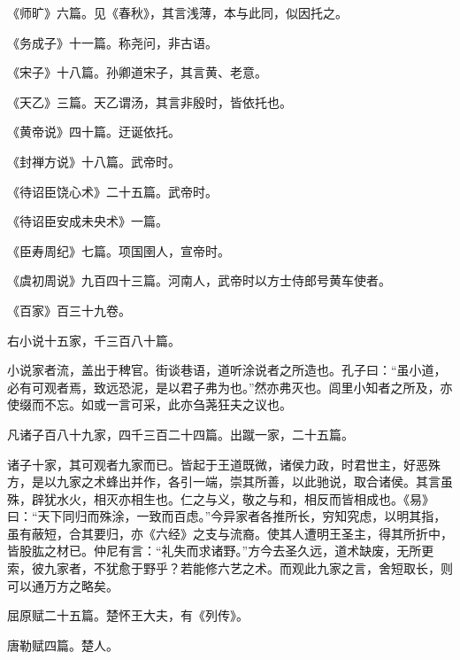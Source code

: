 \documentclass[12pt,UTF8]{ctexbook}
\begin{document}
《师旷》六篇。见《春秋》，其言浅薄，本与此同，似因托之。



《务成子》十一篇。称尧问，非古语。



《宋子》十八篇。孙卿道宋子，其言黄、老意。



《天乙》三篇。天乙谓汤，其言非殷时，皆依托也。



《黄帝说》四十篇。迂诞依托。



《封禅方说》十八篇。武帝时。



《待诏臣饶心术》二十五篇。武帝时。



《待诏臣安成未央术》一篇。



《臣寿周纪》七篇。项国圉人，宣帝时。



《虞初周说》九百四十三篇。河南人，武帝时以方士侍郎号黄车使者。



《百家》百三十九卷。



右小说十五家，千三百八十篇。



小说家者流，盖出于稗官。街谈巷语，道听涂说者之所造也。孔子曰：“虽小道，必有可观者焉，致远恐泥，是以君子弗为也。”然亦弗灭也。闾里小知者之所及，亦使缀而不忘。如或一言可采，此亦刍荛狂夫之议也。



凡诸子百八十九家，四千三百二十四篇。出蹴一家，二十五篇。



诸子十家，其可观者九家而已。皆起于王道既微，诸侯力政，时君世主，好恶殊方，是以九家之术蜂出并作，各引一端，崇其所善，以此驰说，取合诸侯。其言虽殊，辟犹水火，相灭亦相生也。仁之与义，敬之与和，相反而皆相成也。《易》曰：“天下同归而殊涂，一致而百虑。”今异家者各推所长，穷知究虑，以明其指，虽有蔽短，合其要归，亦《六经》之支与流裔。使其人遭明王圣主，得其所折中，皆股肱之材已。仲尼有言：“礼失而求诸野。”方今去圣久远，道术缺废，无所更索，彼九家者，不犹愈于野乎？若能修六艺之术。而观此九家之言，舍短取长，则可以通万方之略矣。



屈原赋二十五篇。楚怀王大夫，有《列传》。



唐勒赋四篇。楚人。
\end{document}
